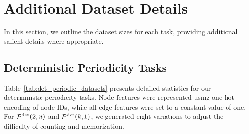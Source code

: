 \section{Additional Dataset Details}
In this section, we outline the dataset sizes for each task, providing additional salient details where appropriate. 

\subsection{Deterministic Periodicity Tasks}\label{appendix:periodicity-deterministic-stats}
Table~\ref{tab:det_periodic_datasets} presents detailed statistics for our deterministic periodicity tasks. Node features were represented using one-hot encoding of node IDs, while all edge features were set to a constant value of one. For $\mathcal{P}^\text{det}(2, n)$ and $\mathcal{P}^\text{det}(k, 1)$, we generated eight variations to adjust the difficulty of counting and memorization.
\begin{table}[ht]
\caption{Deterministic periodicity task statistics}
\centering
\vspace{1em}
\label{tab:det_periodic_datasets}
\end{table}

